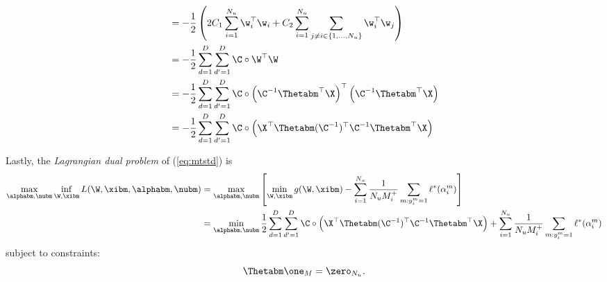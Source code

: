 \begin{equation*}
\begin{aligned}
&= - \frac{1}{2} \left( 2C_1 \sum_{i=1}^{N_u} \w_i^\top \w_i + C_2 \sum_{i=1}^{N_u} \sum_{j \ne i \in \{1,\dots,N_u\}} \w_i^\top \w_j \right) \\
&= - \frac{1}{2} \sum_{d=1}^{D} \sum_{d'=1}^{D} \C \circ \W^\top \W \\
&= - \frac{1}{2} \sum_{d=1}^{D} \sum_{d'=1}^{D} \C \circ \left( \C^{-1} \Thetabm^\top \X \right)^\top  \left( \C^{-1} \Thetabm^\top \X \right) \\
&= - \frac{1}{2} \sum_{d=1}^{D} \sum_{d'=1}^{D} \C \circ \left( \X^\top \Thetabm (\C^{-1})^\top \C^{-1} \Thetabm^\top \X \right) \\
\end{aligned}
\end{equation*}

Lastly, the \emph{Lagrangian dual problem} of (\ref{eq:mtstd}) is
\begin{equation}
\label{eq:mtdual}
\begin{aligned}
\max_{\alphabm, \nubm} \inf_{\W, \xibm} L(\W, \xibm, \alphabm, \nubm) 
&= \max_{\alphabm, \nubm} \left[ \min_{\W, \xibm} g(\W, \xibm)
   - \sum_{i = 1}^{N_u} \frac{1}{N_u M_i^+} \sum_{m: y_i^m = 1} \ell^*(\alpha_i^m) \right] \\
&= \min_{\alphabm, \nubm} \frac{1}{2} \sum_{d=1}^{D} \sum_{d'=1}^{D} \C \circ \left( \X^\top \Thetabm (\C^{-1})^\top \C^{-1} \Thetabm^\top \X \right) 
   + \sum_{i = 1}^{N_u} \frac{1}{N_u M_i^+} \sum_{m: y_i^m = 1} \ell^*(\alpha_i^m) \\
\end{aligned}
\end{equation}
subject to constraints:
\begin{equation*}
\Thetabm \one_M = \zero_{N_u}.
\end{equation*}


